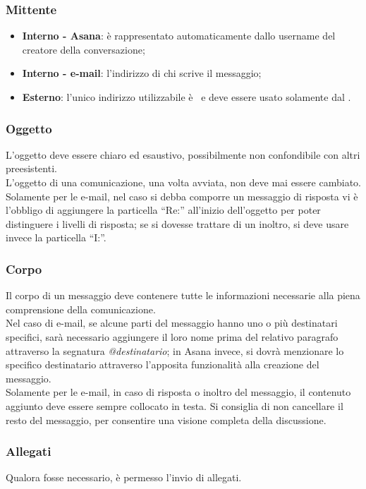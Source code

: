 \documentclass[../NormeDiProgetto.tex]{subfiles}
\begin{document}
				\subsubsection{Mittente}
					\begin{itemize}
						\item \textbf{Interno - Asana}: è rappresentato automaticamente
						dallo username del creatore della conversazione;
						\item \textbf{Interno - e-mail}: l'indirizzo di chi scrive
						il messaggio;
						\item \textbf{Esterno}: l'unico indirizzo utilizzabile è
						\mailkaleidoscode\ e deve essere usato solamente dal
						\responsabilediprogetto.
					\end{itemize}
				\subsubsection{Oggetto}
					L'oggetto deve essere chiaro ed esaustivo, possibilmente non
					confondibile con altri preesistenti.\\
					L'oggetto di una comunicazione, una volta avviata, non deve mai essere cambiato.\\
					Solamente per le e-mail, nel caso si debba
					comporre un messaggio di risposta vi è l'obbligo di aggiungere la
					particella ``Re:'' all'inizio dell'oggetto per poter distinguere i
					livelli di risposta; se si dovesse trattare di un inoltro, si deve
					usare invece la particella ``I:''.
				\subsubsection{Corpo}
					Il corpo di un messaggio deve contenere tutte le informazioni
					necessarie alla piena comprensione della comunicazione.\\
					Nel caso di e-mail, se alcune parti del messaggio hanno uno o più destinatari specifici,
					sarà necessario aggiungere il loro nome	prima del relativo paragrafo
					attraverso la segnatura	\textit{@destinatario};
					in Asana invece, si dovrà menzionare lo specifico destinatario
					attraverso l'apposita funzionalità alla creazione del messaggio.\\
					Solamente per le e-mail, in caso di risposta o inoltro del
					messaggio, il contenuto aggiunto deve essere sempre collocato in testa.
					Si consiglia di non cancellare il resto del messaggio,
					per consentire una visione completa della discussione.
				\subsubsection{Allegati}
					Qualora fosse necessario, è permesso l'invio di allegati. 
					
\end{document}

